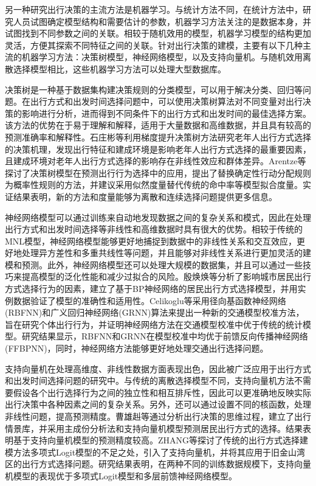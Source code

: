 另一种研究出行决策的主流方法是机器学习。与统计方法不同，在统计方法中，研究人员试图确定模型结构和需要估计的参数，机器学习方法关注的是数据本身，并试图找到不同参数之间的关联\cite{mahesh2020machine}。相较于随机效用的模型，机器学习模型的结构更加灵活，方便其探索不同特征之间的关联。针对出行决策的建模，主要有以下几种主流的机器学习方法：决策树模型，神经网络模型，以及支持向量机\cite{pineda2019review}。与随机效用离散选择模型相比，这些机器学习方法可以处理大型数据库。

决策树是一种基于数据集构建决策规则的分类模型，可以用于解决分类、回归等问题。在出行方式和出发时间选择问题中，可以使用决策树算法对不同变量对出行决策的影响进行分析，进而得到不同条件下的出行方式和出发时间的最佳选择方案。该方法的优势在于易于理解和解释，适用于大量数据和高维数据，并且具有较高的预测准确率和解释性。石庄彬\cite{石庄彬}等利用梯度提升决策树方法研究老年人出行方式选择的决策机理，发现出行特征和建成环境是影响老年人出行方式选择的最重要因素，且建成环境对老年人出行方式选择的影响存在非线性效应和群体差异。Arentze等\cite{arentze2003measuring}探讨了决策树模型在预测出行行为选择中的应用，提出了替换确定性行动分配规则为概率性规则的方法，并建议采用似然度量替代传统的命中率等模型拟合度量。实证结果表明，新的方法和度量能够为离散和连续选择问题提供更多信息。

神经网络模型可以通过训练来自动地发现数据之间的复杂关系和模式，因此在处理出行方式和出发时间选择等非线性和高维数据时具有很大的优势。相较于传统的MNL模型，神经网络模型能够更好地捕捉到数据中的非线性关系和交互效应，更好地处理异方差性和多重共线性等问题，并且能够对非线性关系进行更加灵活的建模和预测。此外，神经网络模型还可以处理大规模的数据集，并且可以通过一些技巧来提高模型的泛化性能和减少过拟合的风险。殷焕焕等\cite{殷焕焕}分析了影响城市居民出行方式选择行为的因素，建立了基于BP神经网络的居民出行方式选择模型，并用实例数据验证了模型的准确性和适用性。Celikoglu等\cite{celikoglu2006application}采用径向基函数神经网络(RBFNN)和广义回归神经网络(GRNN)算法来提出一种新的交通模型校准方法，旨在研究个体出行行为，并证明神经网络方法在交通模型校准中优于传统的统计模型。研究结果显示，RBFNN和GRNN在模型校准中均优于前馈反向传播神经网络(FFBPNN)，同时，神经网络方法能够更好地处理交通出行选择问题。

支持向量机在处理高维度、非线性数据方面表现出色，因此被广泛应用于出行方式和出发时间选择问题的研究中。与传统的离散选择模型不同，支持向量机方法不需要假设各个出行选择行为之间的独立性和相互排斥性，因此可以更准确地反映实际出行决策中各种因素之间的复杂关系。另外，还可以通过设置不同的核函数，处理非线性问题，提高预测精度。曹雄赳等\cite{曹雄赳}通过分析出行决策的思维过程，建立了出行情景库，并采用主成份分析法和支持向量机模型预测居民出行方式的选择。结果表明基于支持向量机模型的预测精度较高。ZHANG等\cite{zhang2008travel}探讨了传统的出行方式选择建模方法多项式Logit模型的不足之处，引入了支持向量机，并将其应用于旧金山湾区的出行方式选择问题。研究结果表明，在两种不同的训练数据规模下，支持向量机模型的表现优于多项式Logit模型和多层前馈神经网络模型。

